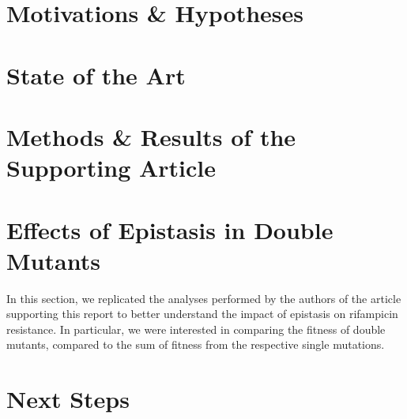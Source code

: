 \documentclass[12pt]{article}
\begin{document}
  \section*{Motivations \& Hypotheses}

  \section*{State of the Art}

  \section*{Methods \& Results of the Supporting Article}

  \section*{Effects of Epistasis in Double Mutants}

  In this section, we replicated the analyses performed by the authors of the
  article supporting this report to better understand the impact of epistasis
  on rifampicin resistance. In particular, we were interested in comparing the
  fitness of double mutants, compared to the sum of fitness from the respective
  single mutations.

  \section*{Next Steps}



  \newpage

  
  
\end{document}
